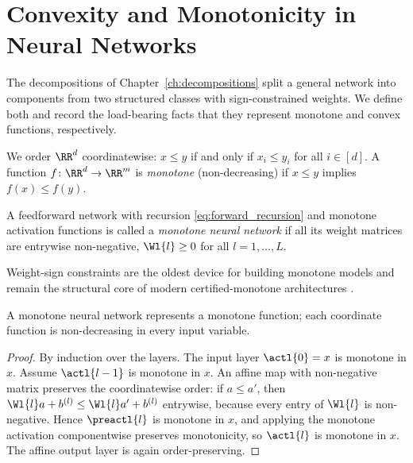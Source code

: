 \section{Convexity and Monotonicity in Neural Networks}\label{sec:convex_monotone_foundations}

The decompositions of Chapter~\ref{ch:decompositions} split a general network into components from two structured classes with sign-constrained weights. We define both and record the load-bearing facts that they represent monotone and convex functions, respectively.

We order $\RR^d$ coordinatewise: $x \le y$ if and only if $x_i \le y_i$ for all $i \in [d]$. A function $f \colon \RR^d \to \RR^m$ is \emph{monotone} (non-decreasing) if $x \le y$ implies $f(x) \le f(y)$.

\begin{definition}\label{def:monotone_network}
A feedforward network with recursion \eqref{eq:forward_recursion} and monotone activation functions is called a \emph{monotone neural network} if all its weight matrices are entrywise non-negative, $\Wl{l} \ge 0$ for all $l = 1, \ldots, L$.
\end{definition}

Weight-sign constraints are the oldest device for building monotone models \cite{Sill1997_MonotonicNetworks,Daniels2010_MonotoneNN} and remain the structural core of modern certified-monotone architectures \cite{Liu2020CertifiedMonotone,Runje_2023}.

\begin{proposition}\label{prop:monotone_represents}
A monotone neural network represents a monotone function; each coordinate function is non-decreasing in every input variable.
\hfill{}
\end{proposition}

\begin{proof}
By induction over the layers. The input layer $\actl{0} = x$ is monotone in $x$. Assume $\actl{l-1}$ is monotone in $x$. An affine map with non-negative matrix preserves the coordinatewise order: if $a \le a'$, then $\Wl{l} a + b^{(l)} \le \Wl{l} a' + b^{(l)}$ entrywise, because every entry of $\Wl{l}$ is non-negative. Hence $\preactl{l}$ is monotone in $x$, and applying the monotone activation componentwise preserves monotonicity, so $\actl{l}$ is monotone in $x$. The affine output layer is again order-preserving.
\end{proof}

